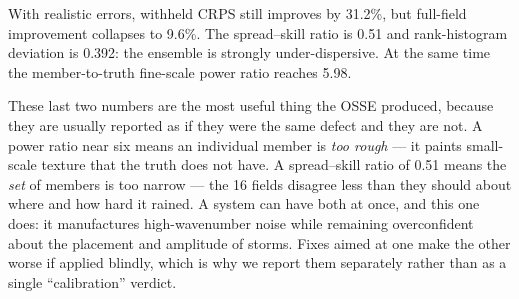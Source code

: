 \documentclass[10pt,twocolumn]{article}
\begin{document}
With realistic errors, withheld CRPS still improves by 31.2\%, but full-field
improvement collapses to 9.6\%. The spread--skill ratio is 0.51 and
rank-histogram deviation is 0.392: the ensemble is strongly under-dispersive.
At the same time the member-to-truth fine-scale power ratio reaches 5.98.

These last two numbers are the most useful thing the OSSE produced, because
they are usually reported as if they were the same defect and they are not. A
power ratio near six means an individual member is \emph{too rough} --- it
paints small-scale texture that the truth does not have. A spread--skill ratio
of 0.51 means the \emph{set} of members is too narrow --- the 16 fields
disagree less than they should about where and how hard it rained. A system
can have both at once, and this one does: it manufactures high-wavenumber
noise while remaining overconfident about the placement and amplitude of
storms. Fixes aimed at one make the other worse if applied blindly, which is
why we report them separately rather than as a single ``calibration'' verdict.
\end{document}
